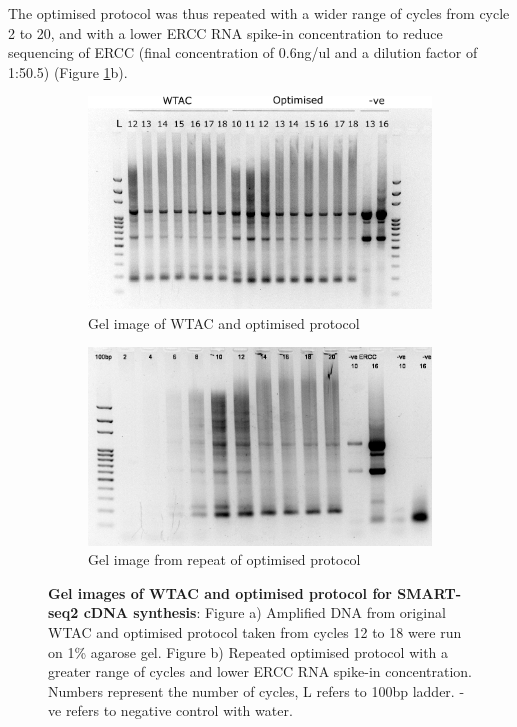 The optimised protocol was thus repeated with a wider range of cycles from cycle 2 to 20, and with a lower ERCC RNA spike-in concentration to reduce sequencing of ERCC (final concentration of 0.6ng/ul and a dilution factor of 1:50.5) (Figure \ref{fig:wtac_optimised_gel1_2}b). 
    

\begin{figure}[h]
	\centering
	\begin{subfigure}{0.4\linewidth}
		\includegraphics[width=\linewidth, height=0.15\textheight]{Figures/WTAC_Adapted_Gel1.png}
		\caption{Gel image of WTAC and optimised protocol}
	\end{subfigure}
	\hspace{2em}
	\begin{subfigure}{0.4\linewidth}
		\includegraphics[width=\linewidth, height=0.15\textheight]{Figures/WTAC_Adapted_Final.png}
		\caption{Gel image from repeat of optimised protocol}
	\end{subfigure}
	\captionsetup{width=0.95\textwidth}
	\caption[Gel image of repeated optimised protocol]%
	{\textbf{Gel images of WTAC and optimised protocol for SMART-seq2 cDNA synthesis}: Figure a) Amplified DNA from original WTAC and optimised protocol taken from cycles 12 to 18 were run on 1\% agarose gel. Figure b) Repeated optimised protocol with a greater range of cycles and lower ERCC RNA spike-in concentration. Numbers represent the number of cycles, L refers to 100bp ladder. -ve refers to negative control with water.} 
	\label{fig:wtac_optimised_gel1_2}
\end{figure} 

